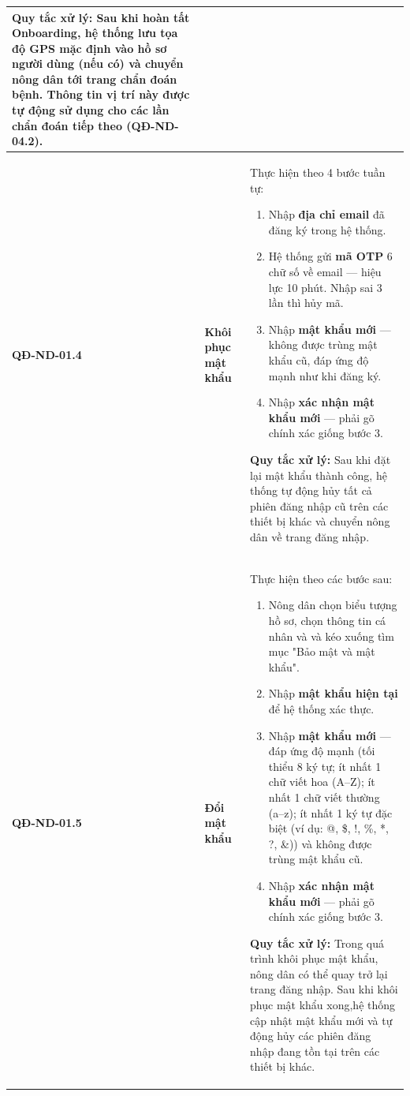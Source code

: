 \documentclass[12pt,a4paper]{article}
\begin{document}
\begin{longtable}{|
        >{\raggedright\arraybackslash}p{2.2cm}|
        >{\raggedright\arraybackslash}p{2.8cm}|
        >{\raggedright\arraybackslash}p{9.8cm}|}
    \textbf{Quy tắc xử lý:} Sau khi hoàn tất Onboarding, hệ thống lưu tọa độ GPS mặc định vào hồ sơ người dùng (nếu có) và chuyển nông dân tới trang chẩn đoán bệnh. Thông tin vị trí này được tự động sử dụng cho các lần chẩn đoán tiếp theo (QĐ-ND-04.2).                                                             \\
    \hline
    \textbf{QĐ-ND-01.4}  & \textbf{Khôi phục mật khẩu}          &
    Thực hiện theo 4 bước tuần tự:
    \begin{enumerate}[leftmargin=*,topsep=2pt,itemsep=1pt]
        \item Nhập \textbf{địa chỉ email} đã đăng ký trong hệ thống.
        \item Hệ thống gửi \textbf{mã OTP} 6 chữ số về email --- hiệu lực 10 phút. Nhập sai 3 lần thì hủy mã.
        \item Nhập \textbf{mật khẩu mới} --- không được trùng mật khẩu cũ, đáp ứng độ mạnh như khi đăng ký.
        \item Nhập \textbf{xác nhận mật khẩu mới} --- phải gõ chính xác giống bước 3.
    \end{enumerate}
    \textbf{Quy tắc xử lý:} Sau khi đặt lại mật khẩu thành công, hệ thống tự động hủy tất cả phiên đăng nhập cũ trên các thiết bị khác và chuyển nông dân về trang đăng nhập.                                                                                                                                            \\
    \hline
    \textbf{QĐ-ND-01.5}  & \textbf{Đổi mật khẩu}                &
    Thực hiện theo các bước sau:
    \begin{enumerate}[leftmargin=*,topsep=2pt,itemsep=1pt]
        \item Nông dân chọn biểu tượng hồ sơ, chọn thông tin cá nhân và và kéo xuống tìm mục "Bảo mật và mật khẩu".
        \item Nhập \textbf{mật khẩu hiện tại} để hệ thống xác thực.
        \item Nhập \textbf{mật khẩu mới} --- đáp ứng độ mạnh (tối thiểu 8 ký tự; ít nhất 1 chữ viết hoa (A--Z); ít nhất 1 chữ viết thường (a--z); ít nhất 1 ký tự đặc biệt (ví dụ: @, \$, !, \%, *, ?, \&)) và không được trùng mật khẩu cũ.
        \item Nhập \textbf{xác nhận mật khẩu mới} --- phải gõ chính xác giống bước 3.
    \end{enumerate}
    \textbf{Quy tắc xử lý:} Trong quá trình khôi phục mật khẩu, nông dân có thể quay trở lại trang đăng nhập. Sau khi khôi phục mật khẩu xong,hệ thống cập nhật mật khẩu mới và tự động hủy các phiên đăng nhập đang tồn tại trên các thiết bị khác.                                                                     \\

\end{longtable}
\end{document}
